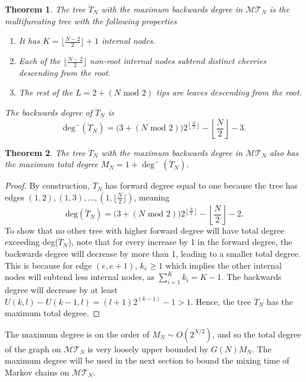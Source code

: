 \documentclass{article}
\newtheorem{theorem}{Theorem}
\begin{document}
\begin{theorem}\label{thm:max-deg-tree}
The tree $\ddot{T}_N$ with the maximum backwards degree in $\mathcal{MT}_N$ is the multifurcating tree with the following properties 
\begin{enumerate}
    \item It has $K=\lfloor \frac{N-2}{2} \rfloor+1$ internal nodes.
    \item Each of the $\lfloor \frac{N-2}{2} \rfloor$ non-root internal nodes subtend distinct cherries descending from the root.
    \item The rest of the $L=2 + (N \text{ mod } 2)$ tips are leaves descending from the root.
\end{enumerate}
The backwards degree of $\ddot{T}_N$ is \[ \text{deg}^-(\ddot{T}_N) = \big (3+ (N \text{ mod } 2) \big) 2^{\left \lfloor \frac{N}{2} \right \rfloor} - \left \lfloor \frac{N}{2} \right \rfloor - 3 .\]
\end{theorem}

\begin{theorem}
The tree $\ddot{T}_N$ with the maximum backwards degree in $\mathcal{MT}_N$ also has the maximum total degree $M_{N}=1+ \deg^-(\ddot{T}_N)$.
\end{theorem}
\begin{proof}
By construction, $\ddot{T}_N$ has forward degree equal to one because the tree has edges $(1,2), (1,3),..., (1,\lfloor \frac{N}{2}\rfloor)$, meaning \[ \text{deg}(\ddot{T}_N) = \big (3+ (N \text{ mod } 2) \big) 2^{\left \lfloor \frac{N}{2} \right \rfloor} - \left \lfloor \frac{N}{2} \right \rfloor - 2. \] 
To show that no other tree with higher forward degree will have total degree exceeding deg($\ddot{T}_{N}$), note that for every increase by 1 in the forward degree, the backwards degree will decrease by more than 1, leading to a smaller total degree. This is because for edge $(e,e+1)$, $k_e \geq 1$ which implies the other internal nodes will subtend less internal nodes, as $\sum^{K}_{i=1}k_{i}=K-1$. The backwards degree will decrease by at least $U(k, l) - U(k-1,l) = (l+1) 2^{(k-1)} -1 >1$. Hence, the tree $\ddot{T}_N$ has the maximum total degree. 
\end{proof}

The maximum degree is on the order of $M_N \sim O(2^{N/2})$, and so the total degree of the graph on $\mathcal{MT}_N$ is very loosely upper bounded by $G(N) M_N$. The maximum degree will be used in the next section to bound the mixing time of Markov chains on $\mathcal{MT}_N$. 
\end{document}
